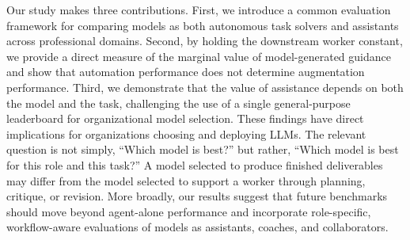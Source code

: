 Our study makes three contributions. First, we introduce a common evaluation framework for comparing models as both autonomous task solvers and assistants across professional domains. Second, by holding the downstream worker constant, we provide a direct measure of the marginal value of model-generated guidance and show that automation performance does not determine augmentation performance. Third, we demonstrate that the value of assistance depends on both the model and the task, challenging the use of a single general-purpose leaderboard for organizational model selection. These findings have direct implications for organizations choosing and deploying LLMs. The relevant question is not simply, ``Which model is best?'' but rather, ``Which model is best for this role and this task?'' A model selected to produce finished deliverables may differ from the model selected to support a worker through planning, critique, or revision. More broadly, our results suggest that future benchmarks should move beyond agent-alone performance and incorporate role-specific, workflow-aware evaluations of models as assistants, coaches, and collaborators.




